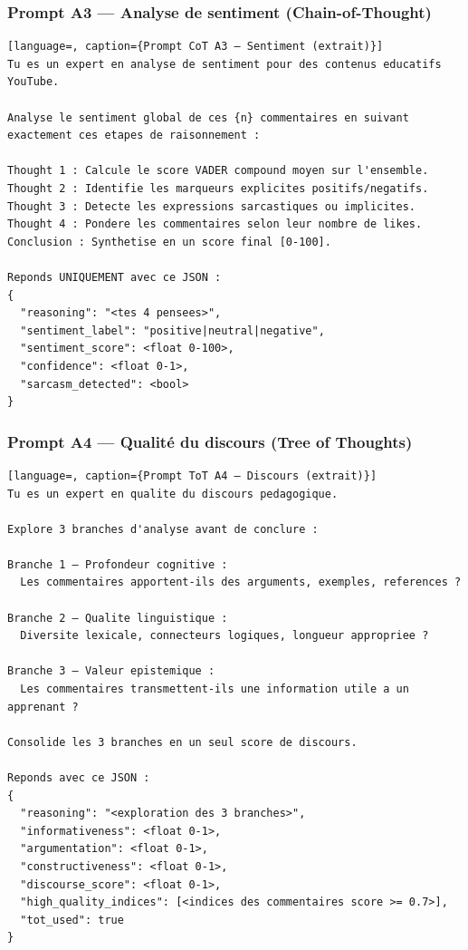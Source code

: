 \documentclass[12pt, a4paper]{article}
\begin{document}
\subsubsection{Prompt A3 — Analyse de sentiment (Chain-of-Thought)}

\begin{lstlisting}[language=, caption={Prompt CoT A3 — Sentiment (extrait)}]
Tu es un expert en analyse de sentiment pour des contenus educatifs YouTube.

Analyse le sentiment global de ces {n} commentaires en suivant
exactement ces etapes de raisonnement :

Thought 1 : Calcule le score VADER compound moyen sur l'ensemble.
Thought 2 : Identifie les marqueurs explicites positifs/negatifs.
Thought 3 : Detecte les expressions sarcastiques ou implicites.
Thought 4 : Pondere les commentaires selon leur nombre de likes.
Conclusion : Synthetise en un score final [0-100].

Reponds UNIQUEMENT avec ce JSON :
{
  "reasoning": "<tes 4 pensees>",
  "sentiment_label": "positive|neutral|negative",
  "sentiment_score": <float 0-100>,
  "confidence": <float 0-1>,
  "sarcasm_detected": <bool>
}
\end{lstlisting}

\subsubsection{Prompt A4 — Qualité du discours (Tree of Thoughts)}

\begin{lstlisting}[language=, caption={Prompt ToT A4 — Discours (extrait)}]
Tu es un expert en qualite du discours pedagogique.

Explore 3 branches d'analyse avant de conclure :

Branche 1 — Profondeur cognitive :
  Les commentaires apportent-ils des arguments, exemples, references ?

Branche 2 — Qualite linguistique :
  Diversite lexicale, connecteurs logiques, longueur appropriee ?

Branche 3 — Valeur epistemique :
  Les commentaires transmettent-ils une information utile a un apprenant ?

Consolide les 3 branches en un seul score de discours.

Reponds avec ce JSON :
{
  "reasoning": "<exploration des 3 branches>",
  "informativeness": <float 0-1>,
  "argumentation": <float 0-1>,
  "constructiveness": <float 0-1>,
  "discourse_score": <float 0-1>,
  "high_quality_indices": [<indices des commentaires score >= 0.7>],
  "tot_used": true
}
\end{lstlisting}
\end{document}
